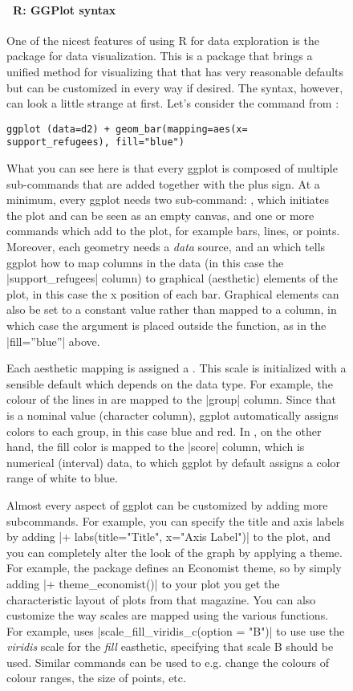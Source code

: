 \begin{figure}
  \vspace{-1em}
\begin{feature}
\footnotesize  \paragraph{\footnotesize\ R: GGPlot syntax}

One of the nicest features of using R for data exploration is the  package for data visualization. This is a package that brings a unified method for visualizing that that has very reasonable defaults but can be customized in every way if desired. The syntax, however, can look a little strange at first. 
Let’s consider the command from :
\begin{verbatim}
ggplot (data=d2) + geom_bar(mapping=aes(x= support_refugees), fill="blue")
\end{verbatim}
What you can see here is that every ggplot is composed of multiple sub-commands that are added together with the plus sign. At a minimum, every ggplot needs two sub-command: , which initiates the plot and can be seen as an empty canvas, and one or more  commands which add  to the plot, for example bars, lines, or points. Moreover, each geometry needs a \emph{data} source, and an  which tells ggplot how to map columns in the data (in this case the |support_refugees| column) to graphical (aesthetic) elements of the plot, in this case the x position of each bar. Graphical elements can also be set to a constant value rather than mapped to a column, in which case the argument is placed outside the  function, as in the |fill=”blue”| above.

Each aesthetic mapping is assigned a . This scale is initialized with a sensible default which depends on the data type. For example, the colour of the lines in   are mapped to the |group| column. Since that is a nominal value (character column), ggplot automatically assigns colors to each group, in this case blue and red.  In , on the other hand, the fill color is mapped to the |score| column, which is numerical (interval) data, to which ggplot by default assigns a color range of white to blue.

Almost every aspect of ggplot can be customized by adding more subcommands. For example, you can specify the title and axis labels by adding |+ labs(title="Title", x="Axis Label")| to the plot, and you can completely alter the look of the graph by applying a theme. For example, the  package defines an Economist theme, so by simply adding |+ theme_economist()| to your plot you get the characteristic layout of plots from that magazine.
You can also customize the way scales are mapped using the various  functions. For example,  uses |scale_fill_viridis_c(option = "B")| to use use the \emph{viridis} scale for the \emph{fill} easthetic, specifying that scale B should be used. Similar commands can be used to e.g. change the colours of colour ranges, the size of points, etc.


\end{feature}
\end{figure}
